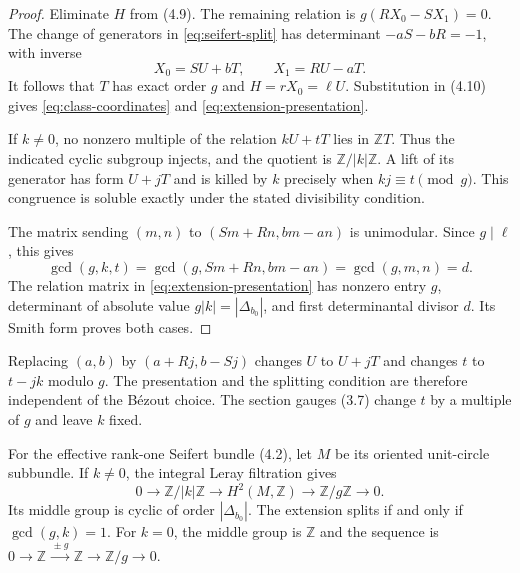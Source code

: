 \documentclass[11pt]{article}
\numberwithin{equation}{section}
\begin{document}
\begin{proof}
Eliminate $H$ from (4.9).  The remaining relation is
$g(RX_0-SX_1)=0$.  The change of generators in
\eqref{eq:seifert-split} has determinant $-aS-bR=-1$, with inverse
\[
             X_0=SU+bT,\qquad X_1=RU-aT.
\]
It follows that $T$ has exact order $g$ and $H=rX_0=\ell U$.
Substitution in (4.10) gives \eqref{eq:class-coordinates} and
\eqref{eq:extension-presentation}.

If $k\ne0$, no nonzero multiple of the relation $kU+tT$ lies in
$\mathbb ZT$.  Thus the indicated cyclic subgroup injects, and the
quotient is $\mathbb Z/|k|\mathbb Z$.  A lift of its generator has
form $U+jT$ and is killed by $k$ precisely when
$kj\equiv t\pmod g$.  This congruence is soluble exactly under the
stated divisibility condition.

The matrix sending $(m,n)$ to $(Sm+Rn,bm-an)$ is unimodular.
Since $g\mid\ell$, this gives
\[
 \gcd(g,k,t)=\gcd(g,Sm+Rn,bm-an)=\gcd(g,m,n)=d.
\]
The relation matrix in \eqref{eq:extension-presentation} has nonzero
entry $g$, determinant of absolute value $g|k|=|\Delta_{b_0}|$,
and first determinantal divisor $d$.  Its Smith form proves both cases.
\end{proof}

Replacing $(a,b)$ by $(a+Rj,b-Sj)$ changes $U$ to $U+jT$ and changes
$t$ to $t-jk$ modulo $g$.  The presentation and the splitting condition
are therefore independent of the B\'ezout choice.
The section gauges (3.7) change $t$ by a multiple of $g$ and leave $k$ fixed.

\begin{proposition}\label{prop:leray-extension}
For the effective rank-one Seifert bundle (4.2), let $M$ be its oriented
unit-circle subbundle.  If $k\ne0$, the integral Leray filtration gives
\begin{equation}\label{eq:leray-extension}
 0\longrightarrow\mathbb Z/|k|\mathbb Z
 \longrightarrow H^2(M,\mathbb Z)
 \longrightarrow\mathbb Z/g\mathbb Z\longrightarrow0.
\end{equation}
Its middle group is cyclic of order $|\Delta_{b_0}|$.
The extension splits if and only if $\gcd(g,k)=1$.
For $k=0$, the middle group is $\mathbb Z$ and the sequence is
$0\to\mathbb Z\xrightarrow{\,\pm g\,}\mathbb Z\to\mathbb Z/g\to0$.
\end{proposition}
\end{document}
